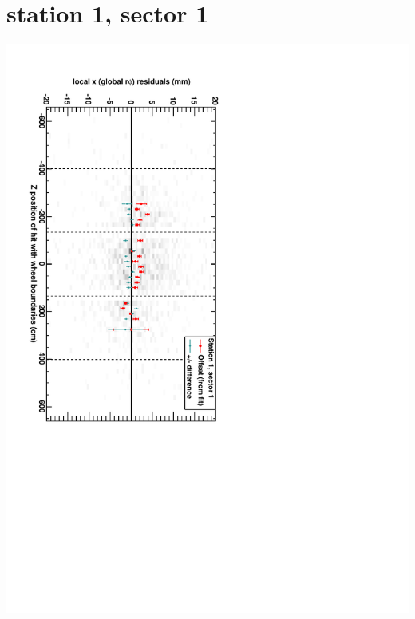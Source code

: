 \documentclass[compress]{beamer}
\begin{document}
\section*{station 1, sector 1}
\begin{frame} \vfill \mbox{\hspace{-1 cm}\includegraphics[height=1.2\linewidth, angle=90]{DTrphiVsZ_st1_sr01.pdf}} \end{frame}
\end{document}
